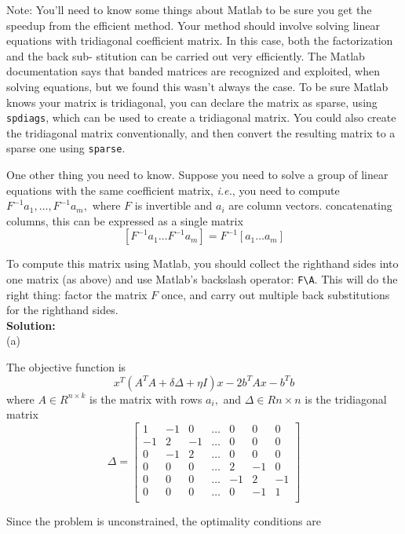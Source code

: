 \documentclass{article}
\begin{document}
Note: You’ll need to know some things about Matlab to be sure you get the speedup
from the efficient method. Your method should involve solving linear equations with
tridiagonal coefficient matrix. In this case, both the factorization and the back sub-
stitution can be carried out very efficiently. The Matlab documentation says that
banded matrices are recognized and exploited, when solving equations, but we found
this wasn’t always the case. To be sure Matlab knows your matrix is tridiagonal, you
can declare the matrix as sparse, using \verb|spdiags|, which can be used to create a tridiagonal matrix. You could also create the tridiagonal matrix conventionally, and then convert the resulting matrix to a sparse one using \verb|sparse|.

One other thing you need to know. Suppose you need to solve a group of linear equations with the same coefficient matrix, \textit{i.e.}, you need to compute 
$F^{-1}a_1, \dots, F^{-1}a_m,$ where $F$ is invertible and $a_i$ are column vectors. concatenating columns, this can be expressed as a single matrix
$$
[F^{-1}a_1 \dots F^{-1} a_m] = F^{-1} [a_1 \dots a_m]
$$

To compute this matrix using Matlab, you should collect the righthand sides into one
matrix (as above) and use Matlab’s backslash operator: \verb|F\A|. This will do the right
thing: factor the matrix $F$ once, and carry out multiple back substitutions for the
righthand sides. \\

\textbf{Solution:}\\

(a)

The objective function is
$$
x^T ( A^TA + \delta \Delta + \eta I)x - 2b^T A x - b^Tb
$$
where $A \in R^{n \times k}$ is the matrix with rows $a_i,$ and $\Delta \in R{n \times n}$ is the tridiagonal matrix
$$
\Delta = \begin{bmatrix} 
	1 & -1 & 0  & \dots & 0 & 0 & 0 \\
	-1 & 2 & -1 & \dots & 0 & 0 & 0 \\
	0 & -1 & 2 & \dots & 0 & 0 & 0 \\	
	0 & 0  & 0 & \dots & 2 & -1 & 0 \\
	0 & 0 & 0 & \dots & -1 & 2 & -1 \\
	0 & 0 & 0 & \dots & 0  & -1 & 1 \\	
\end{bmatrix}
$$

Since the problem is unconstrained, the optimality conditions are
\end{document}

